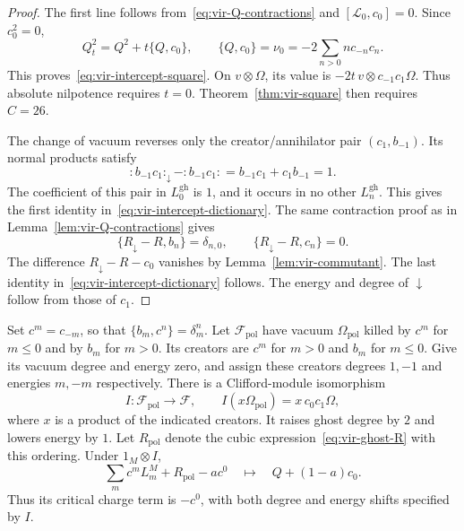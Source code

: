 \begin{proof}
The first line follows from~\eqref{eq:vir-Q-contractions} and $[\mathcal L_0,c_0]=0$.
Since $c_0^2=0$,
\[
 Q_t^2=Q^2+t\{Q,c_0\},\qquad
 \{Q,c_0\}=\nu_0=-2\sum_{n>0}n c_{-n}c_n.
\]
This proves~\eqref{eq:vir-intercept-square}.
On $v\otimes\Omega$, its value is $-2t\,v\otimes c_{-1}c_1\Omega$.
Thus absolute nilpotence requires $t=0$.
Theorem~\ref{thm:vir-square} then requires $C=26$.

The change of vacuum reverses only the creator/annihilator pair $(c_1,b_{-1})$.
Its normal products satisfy
\[
 :b_{-1}c_1:_{\downarrow}-:b_{-1}c_1:
 =b_{-1}c_1+c_1b_{-1}=1.
\]
The coefficient of this pair in $L_0^{\mathrm{gh}}$ is $1$, and it occurs in no other $L_n^{\mathrm{gh}}$.
This gives the first identity in~\eqref{eq:vir-intercept-dictionary}.
The same contraction proof as in Lemma~\ref{lem:vir-Q-contractions} gives
\[
 \{R_{\downarrow}-R,b_n\}=\delta_{n,0},\qquad
 \{R_{\downarrow}-R,c_n\}=0.
\]
The difference $R_{\downarrow}-R-c_0$ vanishes by Lemma~\ref{lem:vir-commutant}.
The last identity in~\eqref{eq:vir-intercept-dictionary} follows.
The energy and degree of $\downarrow$ follow from those of $c_1$.
\end{proof}

\begin{proposition}\label{prop:vir-polarization-map}
Set $c^m=c_{-m}$, so that $\{b_m,c^n\}=\delta_m^n$.
Let $\mathcal F_{\mathrm{pol}}$ have vacuum $\Omega_{\mathrm{pol}}$ killed by $c^m$ for $m\leq0$ and by $b_m$ for $m>0$.
Its creators are $c^m$ for $m>0$ and $b_m$ for $m\leq0$.
Give its vacuum degree and energy zero, and assign these creators degrees $1,-1$ and energies $m,-m$ respectively.
There is a Clifford-module isomorphism
\[
 I:\mathcal F_{\mathrm{pol}}\longrightarrow\mathcal F,
 \qquad I(x\Omega_{\mathrm{pol}})=x\,c_0c_1\Omega,
\]
where $x$ is a product of the indicated creators.
It raises ghost degree by $2$ and lowers energy by $1$.
Let $R_{\mathrm{pol}}$ denote the cubic expression~\eqref{eq:vir-ghost-R} with this ordering.
Under $1_M\otimes I$,
\[
 \sum_m c^mL_m^M+R_{\mathrm{pol}}-ac^0
 \quad\longmapsto\quad Q+(1-a)c_0.
\]
Thus its critical charge term is $-c^0$, with both degree and energy shifts specified by $I$.
\end{proposition}

